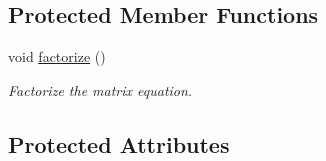 \subsection*{Protected Member Functions}
\begin{DoxyCompactItemize}
\item 
void \hyperlink{classone__d_1_1solver_a33e9bc05b91b4da54ce783235447f334}{factorize} ()
\begin{DoxyCompactList}\small\item\em Factorize the matrix equation. \end{DoxyCompactList}\end{DoxyCompactItemize}
\subsection*{Protected Attributes}
